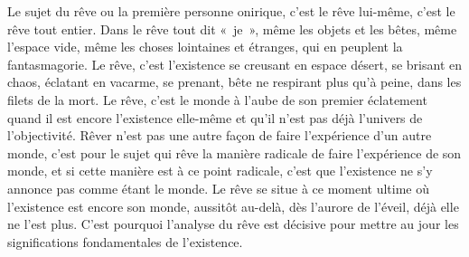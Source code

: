 	{Le sujet du rêve ou la première personne onirique, c'est le rêve
lui-même, c'est le rêve tout entier. Dans le rêve tout dit «~je~»,
même les objets et les bêtes, même l'espace vide, même les choses
lointaines et étranges, qui en peuplent la fantasmagorie. Le rêve,
c'est l'existence se creusant en espace désert, se brisant en chaos,
éclatant en vacarme, se prenant, bête ne respirant plus qu'à peine,
dans les filets de la mort. Le rêve, c'est le monde à l'aube de son
premier éclatement quand il est encore l'existence elle-même et qu'il
n'est pas déjà l'univers de l'objectivité. Rêver n'est pas une autre
façon de faire l'expérience d'un autre monde, c'est pour le sujet qui
rêve la manière radicale de faire l'expérience de son monde, et si
cette manière est à ce point radicale, c'est que l'existence ne s'y
annonce pas comme étant le monde. Le rêve se situe à ce moment ultime
où l'existence est encore son monde, aussitôt au-delà, dès l'aurore
de l'éveil, déjà elle ne l'est plus. C'est pourquoi l'analyse du rêve
est décisive pour mettre au jour les significations fondamentales de
l'existence.
}


